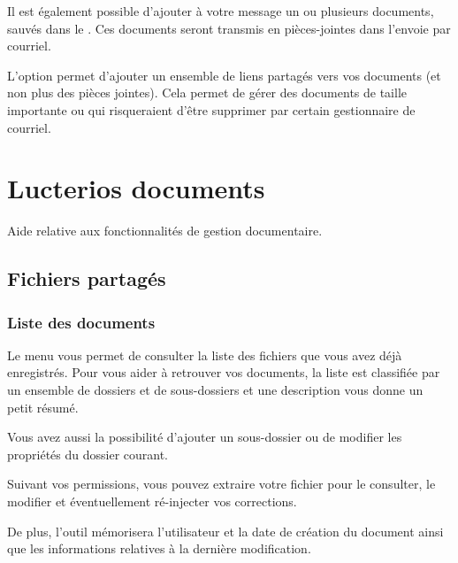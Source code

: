 \documentclass[letterpaper,10pt,french]{sphinxmanual}
\begin{document}
Il est également possible d’ajouter à votre message un ou plusieurs documents, sauvés dans le .
Ces documents seront transmis en pièces-jointes dans l’envoie par courriel.

L’option  permet d’ajouter un ensemble de liens partagés vers vos documents (et non plus des pièces jointes).
Cela permet de gérer des documents de taille importante ou qui risqueraient d’être supprimer par certain gestionnaire de courriel.


\chapter{Lucterios documents}
\label{\detokenize{documents/index::doc}}\label{\detokenize{documents/index:lucterios-documents}}
Aide relative aux fonctionnalités de gestion documentaire.


\section{Fichiers partagés}
\label{\detokenize{documents/shared_document:fichiers-partages}}\label{\detokenize{documents/shared_document::doc}}

\subsection{Liste des documents}
\label{\detokenize{documents/shared_document:liste-des-documents}}
Le menu  vous permet de consulter la liste des fichiers que vous avez déjà enregistrés. Pour vous aider à retrouver vos documents, la liste est classifiée par un ensemble de dossiers et de sous-dossiers et une description vous donne un petit résumé.

Vous avez aussi la possibilité d’ajouter un sous-dossier ou de modifier les propriétés du dossier courant.

\noindent{}

Suivant vos permissions, vous pouvez extraire votre fichier pour le consulter, le modifier et éventuellement ré-injecter vos corrections.

De plus, l’outil mémorisera l’utilisateur et la date de création du document ainsi que les informations relatives à la dernière modification.

\noindent{}
\end{document}

